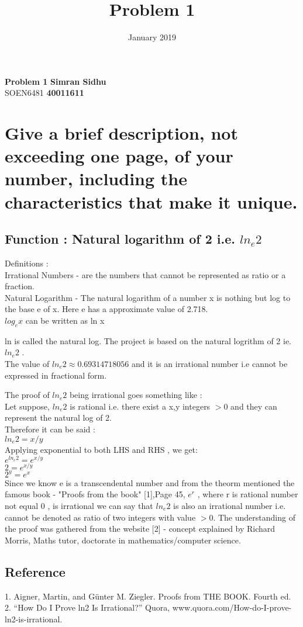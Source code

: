 \documentclass{article}
\title{Problem 1}
\date{January 2019}
\begin{document}
\noindent
\large\textbf{Problem 1} \hfill \textbf{Simran Sidhu} \\
\normalsize SOEN6481 \hfill \textbf{40011611} \\
\section{Give a brief description, not exceeding one page, of your number, including the
characteristics that make it unique.}
\subsection*{Function :  Natural logarithm of 2 i.e. $ln_e{2}$}
Definitions :\\
Irrational Numbers - are the numbers that cannot be represented as ratio or a fraction.\\
Natural Logarithm -  The natural logarithm of a number x is nothing but log to the base e of x. Here  e has a approximate value of 2.718.\\

$log_e{x}$ can be written as ln x

ln is called the natural log. The project is based on the natural logrithm of 2 ie. $ln_e{2}$ . \\
The value of $ln_e{2} \approx 0.69314718056$ and it is an irrational number i.e cannot be expressed in fractional form.

The proof of $ln_e{2}$ being irrational goes something like :\\
Let suppose, $ln_e{2}$ is rational i.e. there exist a x,y integers  $>0$ and they can represent the natural log of 2.\\
Therefore it can be said :\\ 
$ln_e{2}=x/y$\\
Applying exponential to both LHS and RHS , we get:\\
$e^{ln_e{2}}=e^{x / y}$\\
$2=e^{x / y}$\\
$2^y=e^{x}$\\

Since we know e is a transcendental number and from the theorm mentioned the famous book - "Proofs from the book" [1],Page 45, $e^r$ , where r is rational number not equal 0 , is irrational we can say that $ln_e{2}$ is also an irrational number i.e. cannot be denoted as ratio of two integers with value $>0$. The understanding of the proof was gathered from the website [2] - concept explained by Richard Morris, Maths tutor, doctorate in mathematics/computer science.

\subsection*{Reference}
1. Aigner, Martin, and Günter M. Ziegler. Proofs from THE BOOK. Fourth ed.\\
2. “How Do I Prove ln2 Is Irrational?” Quora, www.quora.com/How-do-I-prove-ln2-is-irrational.
\end{document}

